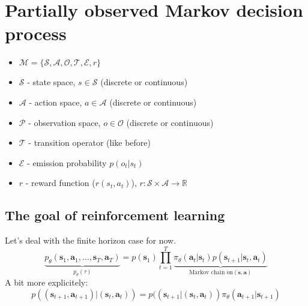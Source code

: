 \documentclass{report}
\begin{document}
\section{Partially observed Markov decision process}
\begin{figure}[htpb]
\begin{center}
\end{center}
\end{figure}
\begin{itemize}
		\item $\mathcal{M} = \{\mathcal{S}, \mathcal{A}, \mathcal{O}, \mathcal{T}, \mathcal{E}, r\}$
\item $\mathcal{S}$ - state space, $s \in \mathcal{S}$ (discrete or continuous)
\item $\mathcal{A}$ - action space, $a \in \mathcal{A}$ (discrete or continuous)
\item $\mathcal{P}$ - observation space, $o \in \mathcal{O}$ (discrete or continuous)
\item $\mathcal{T}$ - transition operator (like before)
\item $\mathcal{E}$ - emission probability $p(o_t|s_t)$
\item $r$ - reward function ($r(s_t, a_t)$), $r : \mathcal{S} \times \mathcal{A} \to \mathbb{R}$
\end{itemize}

\subsection{The goal of reinforcement learning}
Let's deal with the finite horizon case for now.
\begin{equation}
\underbrace{p_\theta(\bm{s}_1, \bm{a}_1, \dots, \bm{s}_T, \bm{a}_T)}_{p_\theta(\tau)} = p(\bm{s}_1) \prod^{T}_{t=1} 
\underbrace{\pi_{\theta} (\bm{a}_t | \bm{s}_t) p (\bm{s}_{t+1} | \bm{s}_t, \bm{a}_t)}_{\text{Markov chain on} (\bm{s}, \bm{a})}
\end{equation}
A bit more explicitely:
\begin{equation}
p((\bm{s}_{t+1}, \bm{a}_{t+1}) | (\bm{s}_t, \bm{a}_t)) = 
p((\bm{s}_{t+1}| (\bm{s}_t, \bm{a}_t)) \pi_\theta (\bm{a}_{t+1} | \bm{s}_{t+1})
\end{equation}
\end{document}
